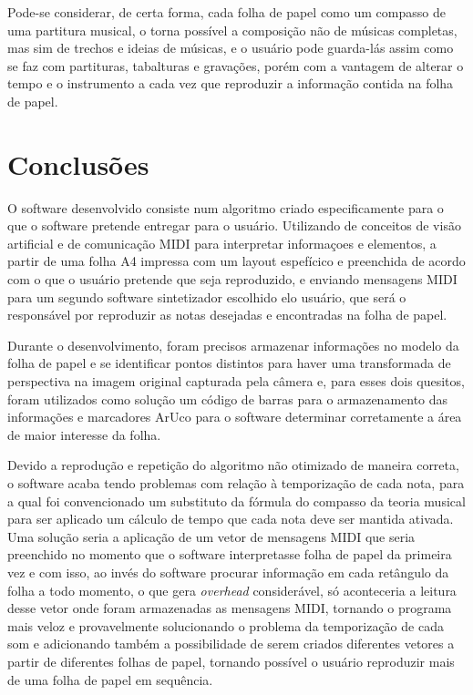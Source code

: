 \documentclass[12pt]{report}
\begin{document}
Pode-se considerar, de certa forma, cada folha de papel como um compasso de uma partitura musical, o torna possível a composição não de músicas completas, mas sim de trechos e ideias de músicas, e o usuário pode guarda-lás assim como se faz com partituras, tabalturas e gravações, porém com a vantagem de alterar o tempo e o instrumento a cada vez que reproduzir a informação contida na folha de papel.

\chapter{Conclusões}
\label{cha:conclusoes}

O software desenvolvido consiste num algoritmo criado especificamente para o que o software pretende entregar para o usuário. Utilizando de conceitos de visão artificial e de comunicação MIDI para interpretar informaçoes e elementos, a partir de uma folha A4 impressa com um layout espefícico e preenchida de acordo com o que o usuário pretende que seja reproduzido, e enviando mensagens MIDI para um segundo software sintetizador escolhido elo usuário, que será o responsável por reproduzir as notas desejadas e encontradas na folha de papel.

Durante o desenvolvimento, foram precisos armazenar informações no modelo da folha de papel e se identificar pontos distintos para haver uma transformada de perspectiva na imagem original capturada pela câmera e, para esses dois quesitos, foram utilizados como solução um código de barras para o armazenamento das informações e marcadores ArUco para o software determinar corretamente a área de maior interesse da folha.

Devido a reprodução e repetição do algoritmo não otimizado de maneira correta, o software acaba tendo problemas com relação à temporização de cada nota, para a qual foi convencionado um substituto da fórmula do compasso da teoria musical para ser aplicado um cálculo de tempo que cada nota deve ser mantida ativada. Uma solução seria a aplicação de um vetor de mensagens MIDI que seria preenchido no momento que o software interpretasse folha de papel da primeira vez e com isso, ao invés do software procurar informação em cada retângulo da folha a todo momento, o que gera {\it overhead} considerável, só aconteceria a leitura desse vetor onde foram armazenadas as mensagens MIDI, tornando o programa mais veloz e provavelmente solucionando o problema da temporização de cada som e adicionando também a possibilidade de serem criados diferentes vetores a partir de diferentes folhas de papel, tornando possível o usuário reproduzir mais de uma folha de papel em sequência.
\end{document}
